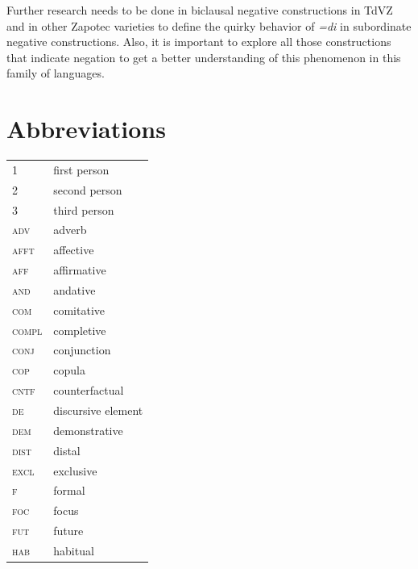 \documentclass[output=paper,colorlinks=true, citecolor=brown]{langscibook}
\begin{document}
Further research needs to be done in biclausal negative constructions in TdVZ and in other Zapotec varieties to define the quirky behavior of \textit{=di} in subordinate negative constructions. Also, it is important to explore all those constructions that indicate negation to get a better understanding of this phenomenon in this family of languages.

\section*{Abbreviations}

\begin{tabularx}{.45\textwidth}{lQ}
{\scshape 1} & first person\\
{\scshape 2} & second person\\
{\scshape 3} & third person\\
{\scshape adv} & adverb\\
{\scshape afft} & affective\\
{\scshape aff} & affirmative\\
{\scshape and} & andative\\
{\scshape com} & comitative\\
{\scshape compl} & completive\\
{\scshape conj} & conjunction\\
{\scshape cop} & copula\\
{\scshape cntf} & counterfactual\\
{\scshape de} & discursive element\\
{\scshape dem} & demonstrative\\
{\scshape dist} & distal \\
{\scshape excl} & exclusive\\
{\scshape f} & formal\\
{\scshape foc} & focus\\
{\scshape fut} & future\\
{\scshape hab} & habitual\\
\end{tabularx}
\end{document}
